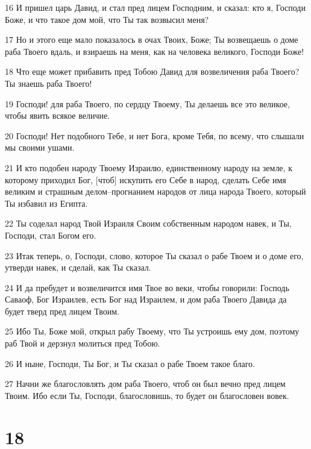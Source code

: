 \par 16 И пришел царь Давид, и стал пред лицем Господним, и сказал: кто я, Господи Боже, и что такое дом мой, что Ты так возвысил меня?
\par 17 Но и этого еще мало показалось в очах Твоих, Боже; Ты возвещаешь о доме раба Твоего вдаль, и взираешь на меня, как на человека великого, Господи Боже!
\par 18 Что еще может прибавить пред Тобою Давид для возвеличения раба Твоего? Ты знаешь раба Твоего!
\par 19 Господи! для раба Твоего, по сердцу Твоему, Ты делаешь все это великое, чтобы явить всякое величие.
\par 20 Господи! Нет подобного Тебе, и нет Бога, кроме Тебя, по всему, что слышали мы своими ушами.
\par 21 И кто подобен народу Твоему Израилю, единственному народу на земле, к которому приходил Бог, [чтоб] искупить его Себе в народ, сделать Себе имя великим и страшным делом--прогнанием народов от лица народа Твоего, который Ты избавил из Египта.
\par 22 Ты соделал народ Твой Израиля Своим собственным народом навек, и Ты, Господи, стал Богом его.
\par 23 Итак теперь, о, Господи, слово, которое Ты сказал о рабе Твоем и о доме его, утверди навек, и сделай, как Ты сказал.
\par 24 И да пребудет и возвеличится имя Твое во веки, чтобы говорили: Господь Саваоф, Бог Израилев, есть Бог над Израилем, и дом раба Твоего Давида да будет тверд пред лицем Твоим.
\par 25 Ибо Ты, Боже мой, открыл рабу Твоему, что Ты устроишь ему дом, поэтому раб Твой и дерзнул молиться пред Тобою.
\par 26 И ныне, Господи, Ты Бог, и Ты сказал о рабе Твоем такое благо.
\par 27 Начни же благословлять дом раба Твоего, чтоб он был вечно пред лицем Твоим. Ибо если Ты, Господи, благословишь, то будет он благословен вовек.

\chapter{18}

